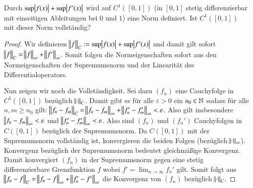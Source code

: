 
\begin{exercise}
  Durch $\sup{\abs{f(x)}}+\sup{\abs{f'(x)}}$ wird auf $C^1([0,1])$ (in $[0,1]$ stetig differenzierbar mit einseitigen Ableitungen bei $0$ und $1$) eine Norm definiert. Ist $C^1([0,1])$ mit dieser Norm vollständig?
\end{exercise}
\begin{proof}
  Wir definieren $\norm{f}_C:=\sup{\abs{f(x)}}+\sup{\abs{f'(x)}}$ und damit gilt sofort $\norm{f}_C=\norm{f}_\infty + \norm{f'}_\infty$. Somit folgen die Normeigenschaften sofort aus den Normeigenschaften der Supremumsnorm und der Linearität des Differentialoperators.

  Nun zeigen wir noch die Vollständigkeit. Sei dazu $(f_n)$ eine Cauchyfolge in $C^1([0,1])$ bezüglich $\norm{\cdot}_C$. Damit gibt es für alle $\varepsilon>0$ ein $n_0\in \mathbb{N}$ sodass für alle $n,m \geq n_0$ gilt: $\norm{f_n-f_m}_C = \norm{f_n-f_m}_\infty + \norm{f_n'-f_m'}_\infty<\varepsilon$. Also gilt insbesondere $\norm{f_n-f_m}_\infty < \varepsilon$ und $\norm{f_n'-f_m'}_\infty<\varepsilon$. Also sind $(f_n)$ und $(f_n')$ Cauchyfolgen in $C([0,1])$ bezüglich der Supremumsnorm. Da $C([0,1])$ mit der Supremumsnorm vollständig ist, konvergieren die beiden Folgen (bezüglich $\norm{\cdot}_\infty$). Konvergenz bezüglich der Supremumsnorm bedeutet gleichmäßige Konvergenz. Damit konvergiert $(f_n)$ in der Supremumsnorm gegen eine stetig differenzierbare Grenzfunktion $f$ wobei $f'=\lim_{n\to\infty}f_n'$ gilt. Somit folgt aus $\norm{f_n-f}_C=\norm{f_n-f}_\infty + \norm{f_n'-f'}_\infty$ die Konvergenz von $(f_n)$ bezüglich $\norm{\cdot}_C$.
\end{proof}
